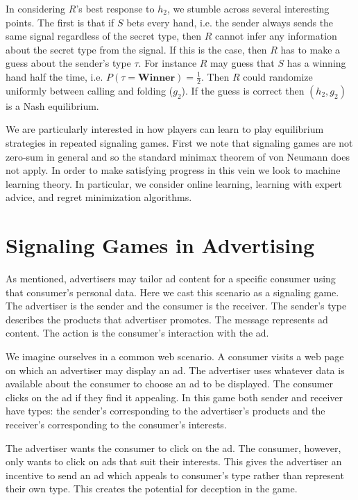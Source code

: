 \documentclass{article}
\begin{document}
In considering $R$'s best response to $h_2$, we stumble across several interesting points. The first is that if $S$ bets every hand, i.e. the sender always sends the same signal regardless of the secret type, then $R$ cannot infer any information about the secret type from the signal. If this is the case, then $R$ has to make a guess about the sender's type $\tau$. For instance $R$ may guess that $S$ has a winning hand half the time, i.e. $P(\tau = \textbf{Winner}) = \frac{1}{2}$. Then $R$ could randomize uniformly between calling and folding ($g_2$). If the guess is correct then $(h_2, g_2)$ is a Nash equilibrium.

We are particularly interested in how players can learn to play equilibrium strategies in repeated signaling games. First we note that signaling games are not zero-sum in general and so the standard minimax theorem of von Neumann does not apply. In order to make satisfying progress in this vein we look to machine learning theory. In particular, we consider online learning, learning with expert advice, and regret minimization algorithms.

\section{Signaling Games in Advertising}

As mentioned, advertisers may tailor ad content for a specific consumer using that consumer's personal data. Here we cast this scenario as a signaling game. The advertiser is the sender and the consumer is the receiver. The sender's type describes the products that advertiser promotes. The message represents ad content. The action is the consumer's interaction with the ad.

We imagine ourselves in a common web scenario. A consumer visits a web page on which an advertiser may display an ad. The advertiser uses whatever data is available about the consumer to choose an ad to be displayed. The consumer clicks on the ad if they find it appealing. In this game both sender and receiver have types: the sender's corresponding to the advertiser's products and the receiver's corresponding to the consumer's interests.

The advertiser wants the consumer to click on the ad. The consumer, however, only wants to click on ads that suit their interests. This gives the advertiser an incentive to send an ad which appeals to consumer's type rather than represent their own type. This creates the potential for deception in the game.
\end{document}
